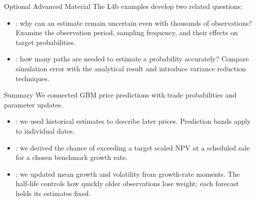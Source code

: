 \documentclass[aspectratio=169,11pt]{beamer}
\begin{document}
\begin{frame}{Optional Advanced Material}
The L4b examples develop two related questions:
\vspace{0.7em}
\begin{itemize}\setlength{\itemsep}{0.9em}
\item {}: why can an estimate remain
uncertain even with thousands of observations? Examine the observation
period, sampling frequency, and their effects on target probabilities.
\item {}: how many paths are
needed to estimate a probability accurately? Compare simulation error
with the analytical result and introduce variance reduction techniques.
\end{itemize}
\end{frame}

\begin{frame}{Summary}
We connected GBM price predictions with trade probabilities and parameter updates.

\vspace{0.6em}
\textbf{}
\begin{itemize}\setlength{\itemsep}{0.75em}
\item {}: we used historical estimates to
describe later prices. Prediction bands apply to individual dates.
\item {}: we derived the chance of exceeding
a target scaled NPV at a scheduled sale for a chosen benchmark growth rate.
\item {}: we updated mean growth and volatility
from growth-rate moments. The half-life controls how quickly older observations
lose weight; each forecast holds its estimates fixed.
\end{itemize}
\end{frame}
\end{document}
